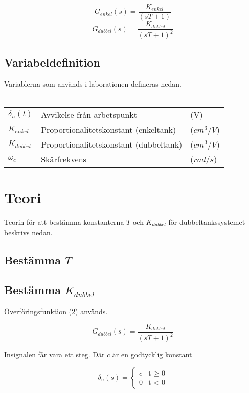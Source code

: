 \documentclass[a4paper]{article}
\begin{document}
\begin{equation}
  G_{enkel}(s)=\frac{K_{enkel}}{(sT+1)}
\end{equation}
\begin{equation}
  G_{dubbel}(s)=\frac{K_{dubbel}}{(sT+1)^2}
\end{equation}

\subsection{Variabeldefinition}

Variablerna som används i laborationen defineras nedan.
\\\\
\begin{tabular}{l l l}
  $\delta_{u}(t)$ & Avvikelse från arbetspunkt & (V) \\
  $K_{enkel}$ & Proportionalitetskonstant (enkeltank) & ($cm^3/V$) \\
  $K_{dubbel}$ & Proportionalitetskonstant (dubbeltank) & ($cm^3/V$) \\
  $\omega_c$ & Skärfrekvens & ($rad/s$)
\end{tabular}

\section{Teori}

Teorin för att bestämma konstanterna $T$ och $K_{dubbel}$ för dubbeltankssystemet beskrivs nedan. 

\subsection{Bestämma $T$}


\subsection{Bestämma $K_{dubbel}$}

Överföringsfunktion (2) används.

\begin{equation}
  G_{dubbel}(s)=\frac{K_{dubbel}}{(sT+1)^2}
\end{equation}

Insignalen får vara ett steg. Där $c$ är en godtycklig konstant

\begin{equation*}
\delta_{u}(s)=\begin{cases}
  c & \text{t $\geq$ 0}  \\
  0 & \text{t $<$ 0} 
\end{cases}
\end{equation*}
\end{document}
